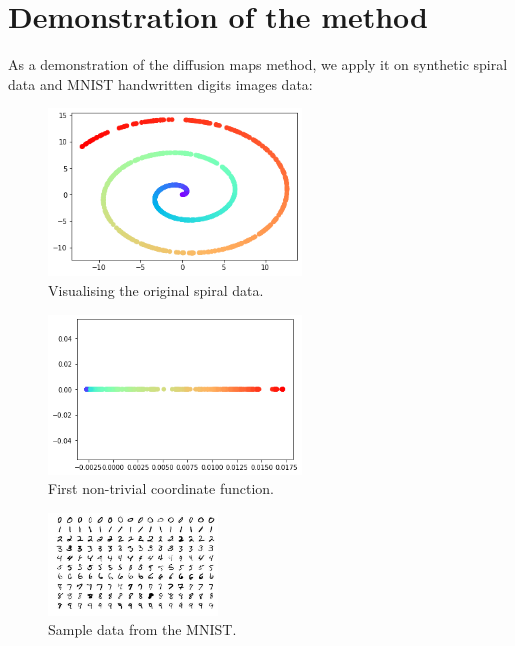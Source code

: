 \section{Demonstration of the method}
As a demonstration of the diffusion maps method, we apply it on synthetic spiral data and MNIST handwritten digits images data:

\begin{figure}[H]
        \includegraphics[width=0.6\textwidth]{presentation/spiral.png}
        \caption{Visualising the original spiral data.}
    \end{figure} 
  \begin{figure}[H]         \includegraphics[width=0.6\textwidth]{presentation/spiral-unroll.png}
        \caption{First non-trivial coordinate function.}
        \end{figure} 
\begin{figure}[H]
        \includegraphics[width=0.4\textwidth]{presentation/mnist-vis.png}
        \caption{Sample data from the MNIST.}
    \end{figure} 
